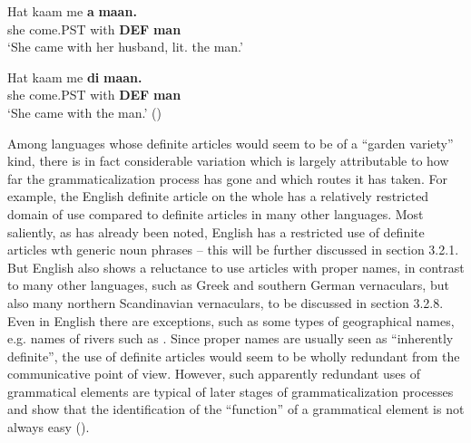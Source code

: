 
 \ea\label{}
\gll Hat  kaam  me  \textbf{a} \textbf{maan.}\\


she  come.PST  with  \textbf{DEF} \textbf{man}\\

\glt ‘She came with her husband, lit. the man.’

\z

\item 


 \ea\label{}
\gll Hat  kaam  me  \textbf{di}\textbf{  maan.}\\


she  come.PST  with  \textbf{DEF} \textbf{man}\\

\glt  ‘She came with the man.’ (\citet[163]{Lyons1999})

\z

Among languages whose definite articles would seem to be of a “garden variety” kind, there is in fact considerable variation which is largely attributable to how far the grammaticalization process has gone and which routes it has taken. For example, the English definite article on the whole has a relatively restricted domain of use compared to definite articles in many other languages. Most saliently, as has already been noted, English has a restricted use of definite articles wth generic noun phrases – this will be further discussed in section 3.2.1. But English also shows a reluctance to use articles with proper names, in contrast to many other languages, such as Greek and southern German vernaculars, but also many northern Scandinavian vernaculars, to be discussed in section 3.2.8. Even in English there are exceptions, such as some types of geographical names, e.g. names of rivers such as . Since proper names are usually seen as “inherently definite”, the use of definite articles would seem to be wholly redundant from the communicative point of view. However, such apparently redundant uses of grammatical elements are typical of later stages of grammaticalization processes and show that the identification of the “function” of a grammatical element is not always easy (\citet[81-86]{Dahl2004}).


